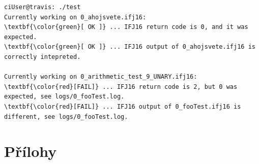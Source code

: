 \documentclass[a4paper,11pt]{article}
\begin{document}

\begin{Verbatim}
ciUser@travis: ./test
Currently working on 0_ahojsvete.ifj16:
\textbf{\color{green}[ OK ]} ... IFJ16 return code is 0, and it was expected.
\textbf{\color{green}[ OK ]} ... IFJ16 output of 0_ahojsvete.ifj16 is correctly intepreted.

Currently working on 0_arithmetic_test_9_UNARY.ifj16:
\textbf{\color{red}[FAIL]} ... IFJ16 return code is 2, but 0 was expected, see logs/0_fooTest.log.
\textbf{\color{red}[FAIL]} ... IFJ16 output of 0_fooTest.ifj16 is different, see logs/0_fooTest.log.
\end{Verbatim}


\section{Přílohy}
\end{document}
